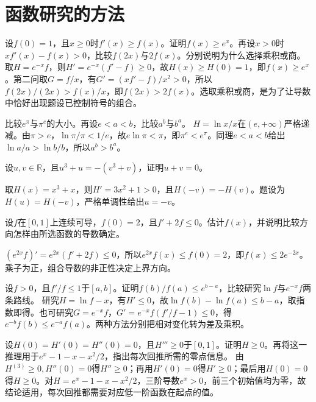 \par\addvspace{12pt}

\section{函数研究的方法}

设\(f(0)=1\)，且\(x\ge0\)时\(f'(x)\ge f(x)\)。证明\(f(x)\ge e^x\)。再设\(x>0\)时\(xf'(x)-f(x)>0\)，比较\(f(2x)\)与\(2f(x)\)。分别说明为什么选择乘积或商。
\solutionanswer
取\(H=e^{-x}f\)，则\(H'=e^{-x}(f'-f)\ge0\)，故\(H(x)\ge H(0)=1\)，即\(f(x)\ge e^x\)。第二问取\(G=f/x\)，有\(G'=(xf'-f)/x^2>0\)，所以\(f(2x)/(2x)>f(x)/x\)，即\(f(2x)>2f(x)\)。选取乘积或商，是为了让导数中恰好出现题设已控制符号的组合。


比较\(e^\pi\)与\(\pi^e\)的大小。再设\(e<a<b\)，比较\(a^b\)与\(b^a\)。
\solutionanswer
\(H=\ln x/x\)在\((e,+\infty)\)严格递减。由\(\pi>e\)，\(\ln\pi/\pi<1/e\)，故\(e\ln\pi<\pi\)，即\(\pi^e<e^\pi\)。同理\(e<a<b\)给出\(\ln a/a>\ln b/b\)，所以\(a^b>b^a\)。


设\(u,v\in\mathbb R\)，且\(u^3+u=-(v^3+v)\)，证明\(u+v=0\)。
\par
\solutionanswer
取\(H(x)=x^3+x\)，则\(H'=3x^2+1>0\)，且\(H(-v)=-H(v)\)。题设为\(H(u)=H(-v)\)，严格单调性给出\(u=-v\)。


设\(f\)在\([0,1]\)上连续可导，\(f(0)=2\)，且\(f'+2f\le0\)。估计\(f(x)\)，并说明比较方向怎样由所选函数的导数确定。
\par
\solutionanswer
\((e^{2x}f)'=e^{2x}(f'+2f)\le0\)，所以\(e^{2x}f(x)\le f(0)=2\)，即\(f(x)\le2e^{-2x}\)。乘子为正，组合导数的非正性决定上界方向。


设\(f>0\)，且\(f'/f\le1\)于\([a,b]\)。证明\(f(b)/f(a)\le e^{b-a}\)，比较研究\(\ln f\)与\(e^{-x}f\)两条路线。
\solutionanswer
研究\(H=\ln f-x\)，有\(H'\le0\)，故\(\ln f(b)-\ln f(a)\le b-a\)，取指数即得。也可研究\(G=e^{-x}f\)，\(G'=e^{-x}f(f'/f-1)\le0\)，得\(e^{-b}f(b)\le e^{-a}f(a)\)。两种方法分别把相对变化转为差及乘积。


设\(H(0)=H'(0)=H''(0)=0\)，且\(H'''\ge0\)于\([0,1]\)。证明\(H\ge0\)。再将这一推理用于\(e^x-1-x-x^2/2\)，指出每次回推所需的零点信息。
\solutionanswer
由\(H^{(3)}\ge0,H''(0)=0\)得\(H''\ge0\)；再用\(H'(0)=0\)得\(H'\ge0\)；最后用\(H(0)=0\)得\(H\ge0\)。对\(H=e^x-1-x-x^2/2\)，三阶导数\(e^x>0\)，前三个初始值均为零，故结论适用，每次回推都需要对应低一阶函数在起点的值。


